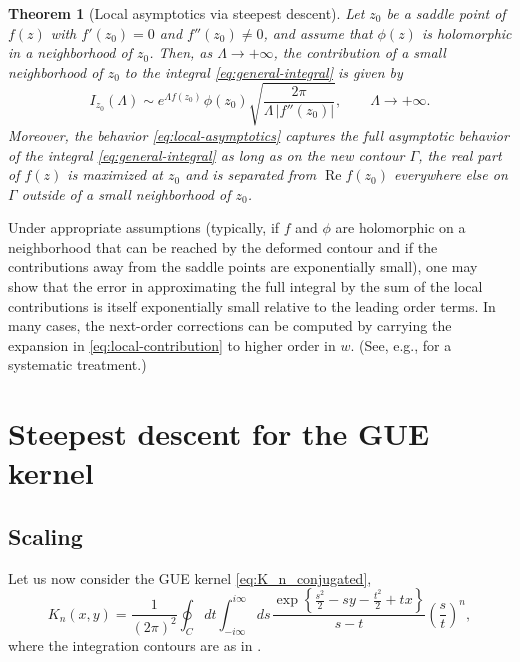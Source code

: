 \documentclass[letterpaper,11pt,oneside,reqno]{article}
\numberwithin{equation}{section}
\newcommand{\ssp}{\hspace{1pt}}
\newtheorem{theorem}[proposition]{Theorem}
\theoremstyle{definition}
\begin{document}
\begin{theorem}[Local asymptotics via steepest descent]
	\label{thm:steepest-descent}
	Let $z_0$ be a saddle point of $f(z)$ with $f'(z_0)=0$ and $f''(z_0)\neq 0$, and assume that $\phi(z)$ is holomorphic in a neighborhood of $z_0$. Then, as $\Lambda\to+\infty$, the contribution of a small neighborhood of $z_0$ to the integral \eqref{eq:general-integral} is given by
	\begin{equation}
		\label{eq:local-asymptotics}
		I_{z_0}(\Lambda)
		\sim e^{\Lambda f(z_0)}\ssp \phi(z_0)
		\sqrt{\frac{2\pi}{\Lambda\,|f''(z_0)|}},\qquad \Lambda\to+\infty.
	\end{equation}
	Moreover, the behavior \eqref{eq:local-asymptotics}
	captures the full asymptotic behavior of the
	integral \eqref{eq:general-integral}
	as long as on the new contour $\Gamma$,
	the real part of $f(z)$ is maximized at $z_0$ and is separated
	from $\operatorname{Re}f(z_0)$ everywhere else on $\Gamma$ outside of a
	small neighborhood of $z_0$.
\end{theorem}

Under appropriate assumptions (typically, if $f$ and $\phi$ are holomorphic on a neighborhood that can be reached by the deformed contour and if the contributions away from the saddle points are exponentially small), one may show that the error in approximating the full integral by the sum of the local contributions is itself exponentially small relative to the leading order terms. In many cases, the next-order corrections can be computed by carrying the expansion in \eqref{eq:local-contribution} to higher order in $w$. (See, e.g., \cite{olver1974asymptotics} for a systematic treatment.)



\section{Steepest descent for the GUE kernel}
\label{sec:steepest-descent-GUE}

\subsection{Scaling}
\label{sub:scaling}

Let us now consider the GUE kernel
\eqref{eq:K_n_conjugated},
\begin{equation*}
	K_n(x,y)=\frac{1}{(2\pi)^2}
	\oint_C dt\int_{-i\infty}^{i\infty}ds\ssp
	\frac{\exp\left\{ \frac{s^2}{2}-sy-\frac{t^2}{2}+tx \right\}}{s-t}\left( \frac{s}{t} \right)^n
	,
\end{equation*}
where the integration contours are as in .
\end{document}
